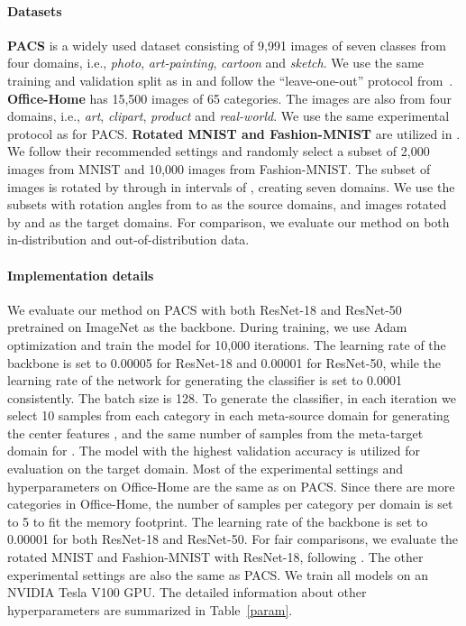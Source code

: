 \documentclass{article} \usepackage[table]{xcolor}
\begin{document}
\paragraph{Datasets}
\textbf{PACS} \citep{li2017deeper} is a widely used dataset consisting of 9,991 images of seven classes from four domains, i.e., \textit{photo}, \textit{art-painting}, \textit{cartoon} and \textit{sketch}. We use the same training and validation split as in \citep{li2017deeper} and follow the ``leave-one-out'' protocol from~\citep{li2017deeper,li2019episodic,carlucci2019domain}. 
\textbf{Office-Home} \citep{venkateswara2017deep} has 15,500 images of 65 categories. The images are also from four domains, i.e., \textit{art}, \textit{clipart}, \textit{product} and \textit{real-world}. We use the same experimental protocol as for PACS. 
\textbf{Rotated MNIST and Fashion-MNIST} are utilized in \cite{piratla2020efficient}.
We follow their recommended settings and randomly select a subset of 2,000 images from MNIST and 10,000 images from Fashion-MNIST. The subset of images is rotated by  through  in intervals of , creating seven domains. We use the subsets with rotation angles from  to  as the source domains, and images rotated by  and  as the target domains. 
For comparison, we evaluate our method on both in-distribution and out-of-distribution data.

\vspace{-2mm}
\paragraph{Implementation details}
We evaluate our method on PACS with both ResNet-18 and ResNet-50 \citep{he2016deep} pretrained on ImageNet \citep{deng2009imagenet} as the backbone.
During training, we use Adam optimization and train the model for 10,000 iterations. 
The learning rate of the backbone is set to 0.00005 for ResNet-18 and 0.00001 for ResNet-50, while the learning rate of the network for generating the classifier is set to 0.0001 consistently.
The batch size is 128. To generate the classifier, in each iteration we select 10 samples from each category in each meta-source domain for generating the center features , and the same number of samples from the meta-target domain for . The model with the highest validation accuracy is utilized for evaluation on the target domain.
Most of the experimental settings and hyperparameters on Office-Home are the same as on PACS. Since there are more categories in Office-Home, the number of samples per category per domain is set to 5 to fit the memory footprint.
The learning rate of the backbone is set to 0.00001 for both ResNet-18 and ResNet-50.
For fair comparisons, we evaluate the rotated MNIST and Fashion-MNIST with ResNet-18, following \citep{piratla2020efficient}.
The other experimental settings are also the same as PACS.
We train all models 
on an NVIDIA Tesla V100 GPU. 
The detailed information about other hyperparameters are summarized in Table~\ref{param}.
\end{document}
